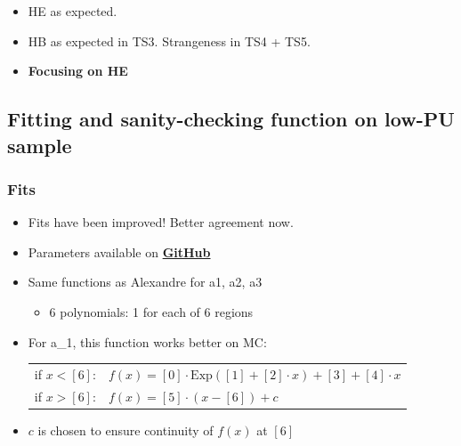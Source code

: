 \documentclass[bigger]{beamer}
\providecommand{\alert}[1]{\textbf{#1}}
\begin{document}
\begin{frame}
\begin{itemize}
\item HE as expected.
\label{sec-3-1-1-2-1}%

\item HB as expected in TS3.  Strangeness in TS4 + TS5.
\label{sec-3-1-1-2-2}%

\item \alert{Focusing on HE}
\label{sec-3-1-1-2-3}%
\end{itemize} %
\end{frame}
\subsection{Fitting and sanity-checking function on low-PU sample}
\label{sec-3-2}
\begin{frame}
\frametitle{Fits}
\label{sec-3-2-1}
\begin{itemize}

\item Fits have been improved! Better agreement now.
\label{sec-3-2-1-1}%

\item Parameters available on \href{https://github.com/edmundaberry/HcalReco/blob/master/analysis/src/fitResults.C}{\alert{GitHub}}
\label{sec-3-2-1-2}%

\item Same functions as Alexandre for a1, a2, a3
\label{sec-3-2-1-3}%
\begin{itemize}

\item 6 polynomials: 1 for each of 6 regions
\label{sec-3-2-1-3-1}%
\end{itemize} %

\item For a\_1, this function works better on MC:\\
\label{sec-3-2-1-4}%
\centering
\begin{tabular}{cl}
if $x < [6]$: & $f(x) = [0] \cdot \text{Exp}([1] + [2] \cdot x) + [3] + [4] \cdot x$ \\
if $x > [6]$: & $f(x) = [5] \cdot ( x - [6] ) + c $\\
\end{tabular}

\item $c$ is chosen to ensure continuity of $f(x)$ at $[6]$
\label{sec-3-2-1-5}%
\end{itemize} %
\end{frame}
\end{document}
